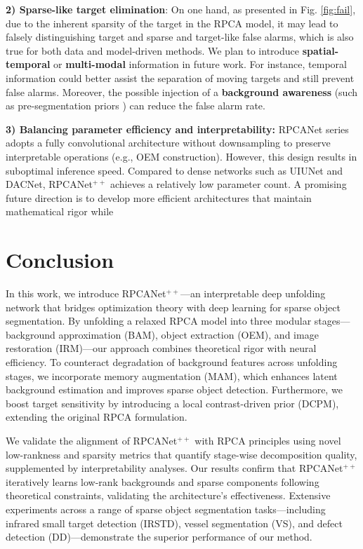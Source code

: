 \documentclass[10pt,journal,compsoc]{IEEEtran}
\begin{document}
\noindent\textbf{2) Sparse-like target elimination}: On one hand, as presented in Fig. \ref{fig:fail}, due to the inherent sparsity of the target in the RPCA model, it may lead to falsely distinguishing target and sparse and target-like false alarms, which is also true for both data and model-driven methods. We plan to introduce \textbf{spatial-temporal} or \textbf{multi-modal} information in future work. For instance, temporal information could better assist the separation of moving targets and still prevent false alarms. Moreover, the possible injection of a \textbf{background awareness} (such as pre-segmentation priors \cite{xiao2024background}) can reduce the false alarm rate. 




\noindent\textbf{3) Balancing parameter efficiency and interpretability:} RPCANet series adopts a fully convolutional architecture without downsampling to preserve interpretable operations (e.g., OEM construction). However, this design results in suboptimal inference speed. Compared to dense networks such as UIUNet and DACNet, RPCANet$^{++}$ achieves a relatively low parameter count. A promising future direction is to develop more efficient architectures that maintain mathematical rigor while 


\section{Conclusion}
\label{sec:5}
\noindent In this work, we introduce RPCANet$^{++}$—an interpretable deep unfolding network that bridges optimization theory with deep learning for sparse object segmentation. By unfolding a relaxed RPCA model into three modular stages—background approximation (BAM), object extraction (OEM), and image restoration (IRM)—our approach combines theoretical rigor with neural efficiency. To counteract degradation of background features across unfolding stages, we incorporate memory augmentation (MAM), which enhances latent background estimation and improves sparse object detection. Furthermore, we boost target sensitivity by introducing a local contrast-driven prior (DCPM), extending the original RPCA formulation.

We validate the alignment of RPCANet$^{++}$ with RPCA principles using novel low-rankness and sparsity metrics that quantify stage-wise decomposition quality, supplemented by interpretability analyses. Our results confirm that RPCANet$^{++}$ iteratively learns low-rank backgrounds and sparse components following theoretical constraints, validating the architecture’s effectiveness. Extensive experiments across a range of sparse object segmentation tasks—including infrared small target detection (IRSTD), vessel segmentation (VS), and defect detection (DD)—demonstrate the superior performance of our method.
\end{document}
